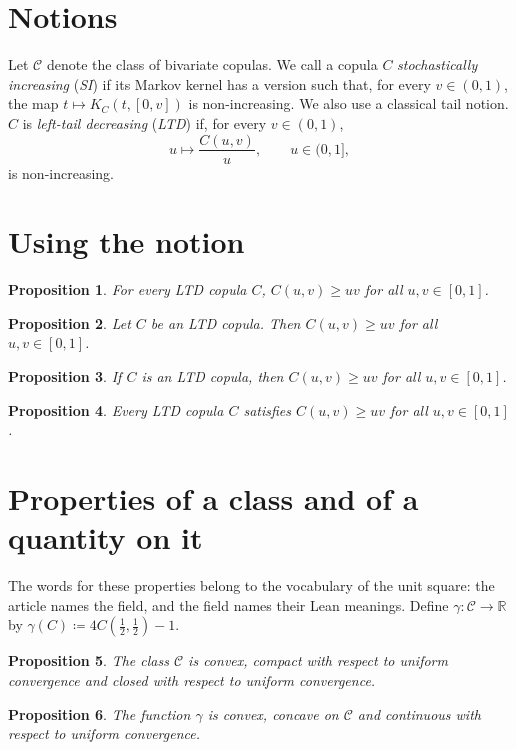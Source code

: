 \documentclass{article}
\newtheorem{proposition}{Proposition}
\newcommand{\CC}{\mathcal{C}}
\begin{document}
\section{Notions}

Let $\CC$ denote the class of bivariate copulas.
We call a copula \(C\) \emph{stochastically increasing} (\emph{SI}) if its Markov kernel has a version such that, for every \(v\in(0,1)\), the map \(t\mapsto K_C(t,[0,v])\) is non-increasing. We also use a classical tail notion. \(C\) is \emph{left-tail decreasing} (\emph{LTD}) if, for every \(v\in(0,1)\),
\begin{equation}\label{eq:ltd}
u\longmapsto\frac{C(u,v)}{u},\qquad u\in(0,1],
\end{equation}
is non-increasing.

\section{Using the notion}

\begin{proposition}
For every LTD copula $C$, $C(u,v)\ge uv$ for all $u,v\in[0,1]$.
\end{proposition}

\begin{proposition}
Let $C$ be an LTD copula. Then $C(u,v)\ge uv$ for all $u,v\in[0,1]$.
\end{proposition}

\begin{proposition}
If $C$ is an LTD copula, then $C(u,v)\ge uv$ for all $u,v\in[0,1]$.
\end{proposition}

\begin{proposition}
Every LTD copula $C$ satisfies $C(u,v)\ge uv$ for all $u,v\in[0,1]$.
\end{proposition}

\section{Properties of a class and of a quantity on it}

The words for these properties belong to the vocabulary of the unit square: the article names the field, and the field names their Lean meanings.
Define $\gamma:\CC\to\mathbb{R}$ by $\gamma(C)\coloneqq 4C(\frac12,\frac12)-1$.

\begin{proposition}
The class $\CC$ is convex, compact with respect to uniform convergence and closed with respect to uniform convergence.
\end{proposition}

\begin{proposition}
The function $\gamma$ is convex, concave on $\CC$ and continuous with respect to uniform convergence.
\end{proposition}
\end{document}
